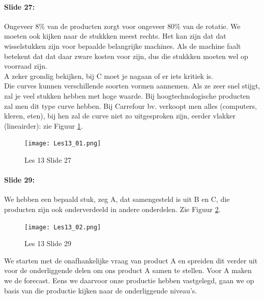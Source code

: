 \documentclass[10pt,a4paper]{report}
\begin{document}
\paragraph{Slide 27:} Ongeveer 8\% van de producten zorgt voor ongeveer 80\% van de rotatie. We moeten ook kijken naar de stukkken meest rechts. Het kan zijn dat dat wisselstukken zijn voor bepaalde belangrijke machines. Als de machine faalt betekent dat dat daar zware kosten voor zijn, dus die stukkken moeten wel op voorraad zijn.\\
A zeker grondig bekijken, bij C moet je nagaan of er iets kritiek is.\\
Die curves kunnen verschillende soorten vormen aannemen. Als ze zeer snel stijgt, zal je veel stukken hebben met hoge waarde. Bij hoogtechnologische producten zal men dit type curve hebben. Bij Carrefour bv. verkoopt men alles (computers, kleren, eten), bij hen zal de curve niet zo uitgesproken zijn, eerder vlakker (lineairder): zie Figuur \ref{les13_01}.

\begin{figure}[h!]
\centering
\texttt{[image: Les13\_01.png]}
\caption{Les 13 Slide 27} 
\label{les13_01}
\end{figure}

\paragraph{Slide 29:} We hebben een bepaald stuk, zeg A, dat samengesteld is uit B en C, die producten zijn ook onderverdeeld in andere onderdelen. Zie Figuur \ref{les13_02}.\\

\begin{figure}[h!]
\centering
\texttt{[image: Les13\_02.png]}
\caption{Les 13 Slide 29} 
\label{les13_02}
\end{figure}

We starten met de onafhankelijke vraag van product A en spreiden dit verder uit voor de onderliggende delen om ons product A samen te stellen. Voor A maken we de forecast. Eens we daarvoor onze productie hebben vastgelegd, gaan we op basis van die productie kijken naar de onderliggende niveau's.
\end{document}
